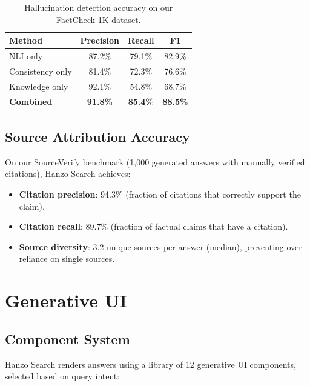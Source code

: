 \documentclass[11pt,twocolumn]{article}
\begin{document}
\begin{table}[H]
\centering
\small
\begin{tabular}{lccc}
\toprule
\textbf{Method} & \textbf{Precision} & \textbf{Recall} & \textbf{F1} \\
\midrule
NLI only & 87.2\% & 79.1\% & 82.9\% \\
Consistency only & 81.4\% & 72.3\% & 76.6\% \\
Knowledge only & 92.1\% & 54.8\% & 68.7\% \\
\textbf{Combined} & \textbf{91.8\%} & \textbf{85.4\%} & \textbf{88.5\%} \\
\bottomrule
\end{tabular}
\caption{Hallucination detection accuracy on our FactCheck-1K dataset.}
\label{tab:hallucination}
\end{table}

\subsection{Source Attribution Accuracy}

On our SourceVerify benchmark (1,000 generated answers with manually verified citations), Hanzo Search achieves:

\begin{itemize}[leftmargin=1.1em]
    \item \textbf{Citation precision}: 94.3\% (fraction of citations that correctly support the claim).
    \item \textbf{Citation recall}: 89.7\% (fraction of factual claims that have a citation).
    \item \textbf{Source diversity}: 3.2 unique sources per answer (median), preventing over-reliance on single sources.
\end{itemize}

\section{Generative UI}
\label{sec:genui}

\subsection{Component System}

Hanzo Search renders answers using a library of 12 generative UI components, selected based on query intent:
\end{document}

